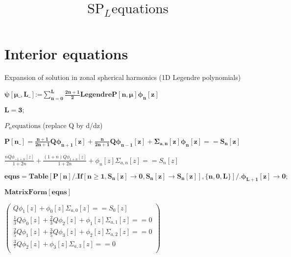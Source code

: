 \documentclass{article}
\begin{document}
\title{\(\text{SP}_L \text{equations}\)}
\author{}
\date{}
\maketitle

\section*{Interior equations}

Expansion of solution in zonal spherical harmonics (1D Legendre polynomials)

\begin{doublespace}
\noindent\(\pmb{\psi [\mu \_,\text{L$\_$}]\text{:=}\sum _{n=0}^L \frac{2n+1}{2}\text{LegendreP}[n,\mu ] \phi _n[z]}\)
\end{doublespace}

\begin{doublespace}
\noindent\(\pmb{L=3;}\)
\end{doublespace}

\(P_n\text{equations}\) (replace Q by d/dz)

\begin{doublespace}
\noindent\(\pmb{P[\text{n$\_$}]=\frac{n+1}{2n+1}Q \phi _{n+1}[z] +\frac{n}{2n+1}Q \phi _{n-1}[z]+\Sigma _{a,n}[z]\phi _n[z]==S_n[z]}\)
\end{doublespace}

\begin{doublespace}
\noindent\(\frac{n Q \phi _{-1+n}[z]}{1+2 n}+\frac{(1+n) Q \phi _{1+n}[z]}{1+2 n}+\phi _n[z] \Sigma _{a,n}[z]==S_n[z]\)
\end{doublespace}

\begin{doublespace}
\noindent\(\pmb{\text{eqns}=\text{Table}\left[P[n]\text{/.}\text{If}\left[n\geq 1, S_n[z]\to 0,S_n[z]\to S_n[z]\right],\{n,0,L\}\right]\text{/.}\phi
_{L+1}[z]\to 0;}\)
\end{doublespace}

\begin{doublespace}
\noindent\(\pmb{\text{MatrixForm}[\text{eqns}]}\)
\end{doublespace}

\begin{doublespace}
\noindent\(\left(
\begin{array}{c}
 Q \phi _1[z]+\phi _0[z] \Sigma _{a,0}[z]==S_0[z] \\
 \frac{1}{3} Q \phi _0[z]+\frac{2}{3} Q \phi _2[z]+\phi _1[z] \Sigma _{a,1}[z]==0 \\
 \frac{2}{5} Q \phi _1[z]+\frac{3}{5} Q \phi _3[z]+\phi _2[z] \Sigma _{a,2}[z]==0 \\
 \frac{3}{7} Q \phi _2[z]+\phi _3[z] \Sigma _{a,3}[z]==0 \\
\end{array}
\right)\)
\end{doublespace}
\end{document}
